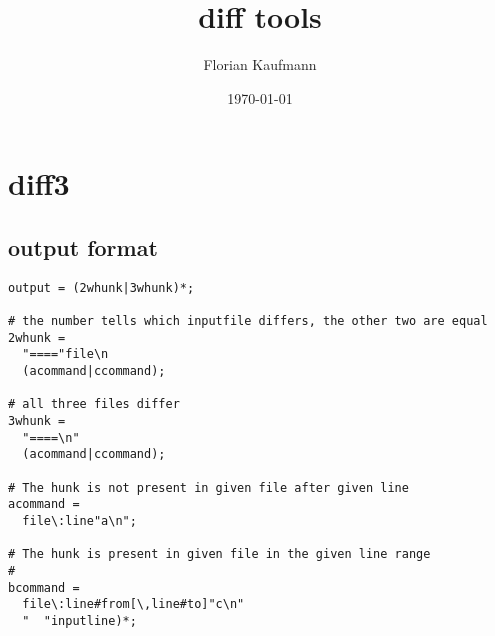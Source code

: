 \documentclass[a4paper]{report}
\begin{document}
\author{Florian Kaufmann}
\title{diff tools}
\date{\today}
\maketitle

\begin{abstract}
\end{abstract}

\tableofcontents

\section{diff3}

\subsection{output format}

\begin{verbatim}
output = (2whunk|3whunk)*;
       
# the number tells which inputfile differs, the other two are equal       
2whunk =
  "===="file\n
  (acommand|ccommand);
       
# all three files differ       
3whunk =
  "====\n"
  (acommand|ccommand);
  
# The hunk is not present in given file after given line
acommand =
  file\:line"a\n";
  
# The hunk is present in given file in the given line range
#   
bcommand =  
  file\:line#from[\,line#to]"c\n"
  "  "inputline)*;

\end{verbatim}
                   
\end{document}

